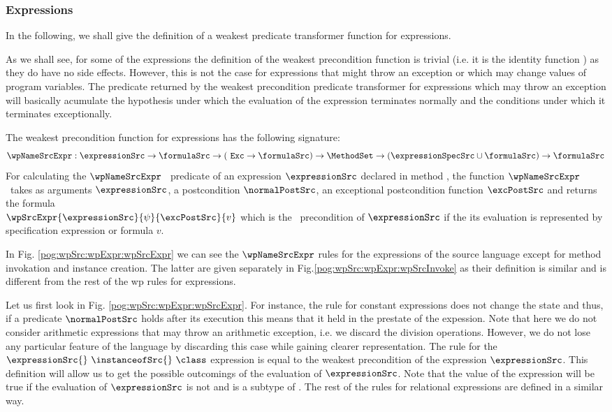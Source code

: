 \subsubsection{Expressions}\label{pog:wpSrc:wpExpr}
In the following, we shall give the definition of a weakest
predicate transformer function for expressions. 


As we shall see,  for some of the expressions   
the definition of the weakest precondition function is trivial (i.e. it is the identity function )
 as they do have  no side effects.
 However, this is not the case for expressions that might throw an exception or which may change values of program variables.
 The predicate returned by the weakest precondition predicate transformer for expressions which may throw an exception 
will basically acumulate the hypothesis under which the evaluation 
of the expression terminates normally and the  conditions under which it  terminates exceptionally.


The weakest precondition function for expressions has the following signature:
$$ \wpNameSrcExpr : \expressionSrc \rightarrow \formulaSrc \rightarrow ( \mbox{ \rm \texttt{Exc}} \rightarrow  \formulaSrc ) \rightarrow  
\MethodSet \rightarrow   (\expressionSpecSrc \cup \formulaSrc)  \rightarrow  \formulaSrc $$
For calculating the  $\wpNameSrcExpr$ \ predicate  of  an expression $\expressionSrc$ declared in method \methodd,
 the function $\wpNameSrcExpr$ \ takes as arguments  $\expressionSrc$, a postcondition $\normalPostSrc$, an exceptional postcondition 
function $\excPostSrc$  and 
  returns the    formula \\
$\wpSrcExpr{\expressionSrc}{\psi}{\excPostSrc}{ v }$ which is the \wpName \ precondition of $\expressionSrc$ 
if the its evaluation is represented by  specification expression or formula $v$.


In Fig. \ref{pog:wpSrc:wpExpr:wpSrcExpr} we can see the $\wpNameSrcExpr$ rules for the expressions of the source language except for method invokation 
and instance creation. The latter are given separately in Fig.\ref{pog:wpSrc:wpExpr:wpSrcInvoke} as their definition is similar and is different from 
the rest of the wp rules for expressions.

Let us first look in Fig. \ref{pog:wpSrc:wpExpr:wpSrcExpr}.
For instance, the rule for constant expressions does not change the state and thus, if a predicate $ \normalPostSrc$ holds
 after its execution this means that it held in the prestate of the expession. 
Note that here we do not consider arithmetic expressions that may throw
an arithmetic exception, i.e. we discard the division operations. However,  
we do not lose any particular feature of the language by discarding this case 
while gaining clearer representation. 
The rule for the $\expressionSrc{} \  \instanceofSrc{}  \ \class $ expression is equal to the weakest precondition 
of the expression $\expressionSrc$.  This definition will allow us to get the possible outcomings  of the evaluation 
of $\expressionSrc$. Note that the value of the \instanceofSrc{}  expression will be true if  
the evaluation of $\expressionSrc$ is not \Mynull{} and is a subtype of \class{}.
The rest of the rules for  relational expressions are defined in a similar way.
 

